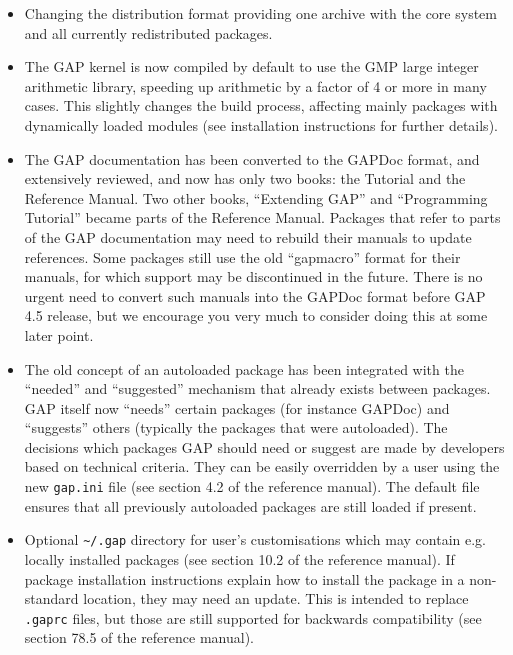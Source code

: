 \documentclass[10pt]{article}
\newcommand{\todo}[1]{}%
\begin{document}
\begin{itemize}

\item
Changing the distribution format providing one archive with the core system
and all currently redistributed packages.

\item
The GAP kernel is now compiled by default to use the GMP large integer arithmetic library, speeding up arithmetic by a factor of 4 or more in many cases.
 This slightly changes the build process, affecting mainly packages with dynamically loaded modules (see installation instructions for further details).

\todo{Document build options --with-gmp, --with-abi, --with-readline in the manual and README.}

\item
The GAP documentation has been converted to the GAPDoc format, and extensively reviewed, and now has only
two books: the Tutorial and the Reference Manual. Two other books, ``Extending 
GAP'' and ``Programming Tutorial'' became parts of the Reference Manual. Packages
that refer to parts of the GAP documentation may need to rebuild their manuals
to update references. Some packages still use the old ``gapmacro'' format for
their manuals, for which support may be discontinued in the future. There is no urgent need to convert such manuals into the GAPDoc format before GAP 4.5 release, but we 
encourage you very much to consider doing this at some later point. 

\item
The old concept of an autoloaded package has been integrated with the ``needed'' 
and ``suggested'' mechanism that already exists between packages. GAP itself 
now ``needs'' certain packages 
(for instance GAPDoc) and ``suggests'' others (typically the packages that were 
autoloaded). The decisions 
which packages GAP should need or suggest are made by developers based on 
technical criteria. They can be easily overridden by a user 
using the new \verb|gap.ini| file (see section 4.2 of the reference manual). 
The default file ensures that all previously autoloaded packages are still loaded if present.

\item
Optional \verb|~/.gap| directory for user's customisations which may contain e.g.
locally installed packages (see section 10.2 of the reference manual). If package installation instructions explain how
to install the package in a non-standard location, they may need an update. 
This is intended to replace \verb|.gaprc| files, but those are still supported 
for backwards compatibility (see section 78.5 of the reference manual).


\end{itemize}
\end{document}
